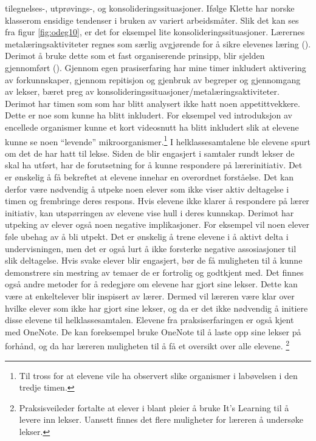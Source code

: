\documentclass[main.tex]{subfiles}
\begin{document}
tilegnelses-, utprøvings-, og konsolideringssituasjoner. Ifølge Klette har norske klasserom ensidige 
tendenser i bruken av variert arbeidsmåter. Slik det kan ses fra figur \ref{fig:odeg10}, er det for 
eksempel lite konsolideringssituasjoner. Lærernes metalæringsaktiviteter regnes som særlig 
avgjørende for å sikre elevenes læring (). Derimot å bruke dette som et fast
organiserende prinsipp, blir sjelden gjennomført (). Gjennom egen prasiserfaring
har mine timer inkludert aktivering av forkunnskaper, gjennom repitisjon og gjenbruk av begreper 
og gjennomgang av lekser, bæret preg av konsolideringssituasjoner/metalæringsaktiviteter. Derimot
har timen som som har blitt analysert ikke hatt noen appetittvekkere. Dette er noe som kunne ha blitt 
inkludert. For eksempel ved introduksjon av encellede organismer kunne et kort videosnutt ha blitt
inkludert slik at elevene kunne se noen ``levende'' mikroorganismer.\footnote[3]{Til tross for at 
elevene vile ha observert slike organismer i labøvelsen i den tredje timen.}  
\newline
\newline
I helklassesamtalene ble elevene spurt om det de har hatt til lekse.
Siden de blir engasjert i samtaler rundt lekser de skal ha utført, har de forutsetning for å kunne 
respondere på lærerinitiativ. Det er ønskelig å få bekreftet at elevene innehar en overordnet 
forståelse. Det kan derfor være nødvendig å utpeke noen elever som ikke viser aktiv deltagelse i 
timen og frembringe deres respons. Hvis elevene ikke klarer å respondere på lærer initiativ, kan 
utspørringen av elevene vise hull i deres kunnskap. Derimot har utpeking av elever også noen 
negative implikasjoner. For eksempel vil noen elever føle ubehag av å bli utpekt. Det er ønskelig å 
trene elevene i å aktivt delta i undervisningen, men det er også lurt å ikke forsterke negative 
assosiasjoner til slik deltagelse. Hvis svake elever blir engasjert, bør de få muligheten til å 
kunne demonstrere sin mestring av temaer de er fortrolig og godtkjent med. Det finnes også andre 
metoder for å redegjøre om elevene har gjort sine lekser. Dette kan være at enkeltelever blir 
inspisert av lærer. Dermed vil læreren være klar over hvilke elever som ikke har gjort sine lekser, 
og da er det ikke nødvendig å initiere disse elevene til helklassesamtalen. Elevene fra 
praksiserfaringen er også kjent med OneNote. De kan foreksempel bruke OneNote til å laste opp 
sine lekser på forhånd, og da har læreren muligheten til å få et oversikt over alle elevene.
\footnote[4]{Praksisveileder fortalte at elever i blant pleier å bruke It's Learning til å levere
inn lekser. Uansett finnes det flere muligheter for læreren å undersøke lekser.}
\end{document}
